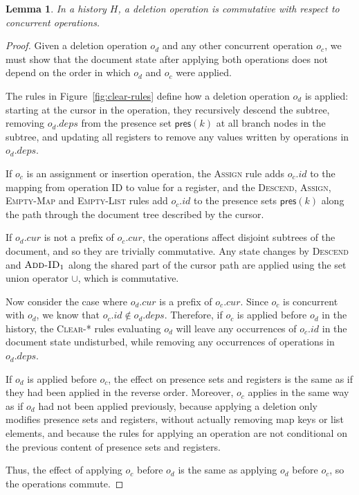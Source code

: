 \documentclass[10pt,journal,compsoc]{IEEEtran}
\newtheorem{lemma}[theorem]{Lemma}
\begin{document}
\begin{lemma}\label{lem:delete-commute}
In a history $H$, a deletion operation is commutative with respect to concurrent operations.
\end{lemma}

\begin{proof}
Given a deletion operation $o_d$ and any other concurrent operation $o_c$, we must show that the document state after applying both operations does not depend on the order in which $o_d$ and $o_c$ were applied.

The rules in Figure~\ref{fig:clear-rules} define how a deletion operation $o_d$ is applied: starting at the cursor in the operation, they recursively descend the subtree, removing $o_d.\mathit{deps}$ from the presence set $\mathsf{pres}(k)$ at all branch nodes in the subtree, and updating all registers to remove any values written by operations in $o_d.\mathit{deps}$.

If $o_c$ is an assignment or insertion operation, the \textsc{Assign} rule adds $o_c.\mathit{id}$ to the mapping from operation ID to value for a register, and the \textsc{Descend}, \textsc{Assign}, \textsc{Empty-Map} and \textsc{Empty-List} rules add $o_c.\mathit{id}$ to the presence sets $\mathsf{pres}(k)$ along the path through the document tree described by the cursor.

If $o_d.\mathit{cur}$ is not a prefix of $o_c.\mathit{cur}$, the operations affect disjoint subtrees of the document, and so they are trivially commutative. Any state changes by \textsc{Descend} and $\textsc{Add-ID}_1$ along the shared part of the cursor path are applied using the set union operator $\cup$, which is commutative.

Now consider the case where $o_d.\mathit{cur}$ is a prefix of $o_c.\mathit{cur}$. Since $o_c$ is concurrent with $o_d$, we know that $o_c.\mathit{id} \notin o_d.\mathit{deps}$. Therefore, if $o_c$ is applied before $o_d$ in the history, the \textsc{Clear-*} rules evaluating $o_d$ will leave any occurrences of $o_c.\mathit{id}$ in the document state undisturbed, while removing any occurrences of operations in $o_d.\mathit{deps}$.

If $o_d$ is applied before $o_c$, the effect on presence sets and registers is the same as if they had been applied in the reverse order. Moreover, $o_c$ applies in the same way as if $o_d$ had not been applied previously, because applying a deletion only modifies presence sets and registers, without actually removing map keys or list elements, and because the rules for applying an operation are not conditional on the previous content of presence sets and registers.

Thus, the effect of applying $o_c$ before $o_d$ is the same as applying $o_d$ before $o_c$, so the operations commute.
\end{proof}
\end{document}
